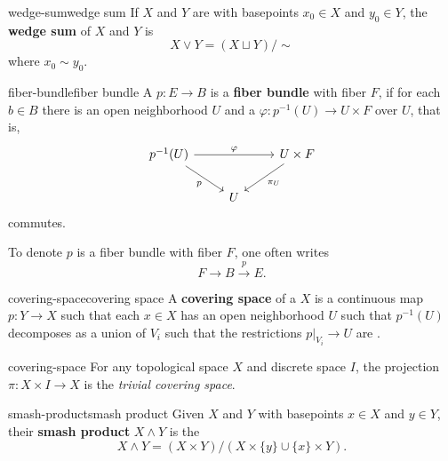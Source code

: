 \begin{topic}{wedge-sum}{wedge sum}
    If $X$ and $Y$ are  with basepoints $x_0 \in X$ and $y_0 \in Y$, the \textbf{wedge sum} of $X$ and $Y$ is 
    \[ X \vee Y = (X \sqcup Y) / \sim{} \]
    where $x_0 \sim{} y_0$.
\end{topic}

\begin{topic}{fiber-bundle}{fiber bundle}
    A  $p : E \to B$ is a \textbf{fiber bundle} with fiber $F$, if for each $b \in B$ there is an open neighborhood $U$ and a  $\varphi : p^{-1}(U) \to U \times F$ over $U$, that is,
    \[ \begin{tikzcd}
        p^{-1}(U) \arrow{rr}{\varphi} \arrow[swap]{dr}{p} && U \times F \arrow{ld}{\pi_U} \\ & U &
    \end{tikzcd} \]
    commutes.
    
    To denote $p$ is a fiber bundle with fiber $F$, one often writes
    \[ F \to B \xrightarrow{p} E . \]
\end{topic}

\begin{topic}{covering-space}{covering space}
    A \textbf{covering space} of a  $X$ is a continuous map $p : Y \to X$ such that each $x \in X$ has an open neighborhood $U$ such that $p^{-1}(U)$ decomposes as a union of $V_i$ such that the restrictions $p|_{V_i} \to U$ are .
\end{topic}

\begin{example}{covering-space}
    For any topological space $X$ and discrete space $I$, the projection $\pi : X \times I \to X$ is the \textit{trivial covering space}.
\end{example}

\begin{topic}{smash-product}{smash product}
    Given  $X$ and $Y$ with basepoints $x \in X$ and $y \in Y$, their \textbf{smash product} $X \wedge Y$ is the 
    \[ X \wedge Y = (X \times Y) / (X \times \{ y \} \cup \{ x \} \times Y) . \]
\end{topic}

